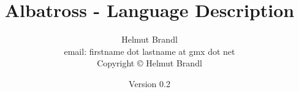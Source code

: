 \documentclass[10pt]{report}
\begin{document}
\title{Albatross - Language Description} \date{Version 0.2}
\author{Helmut Brandl \\
  {\scriptsize email: firstname dot lastname at gmx dot net} \\
  {\scriptsize Copyright {\copyright} Helmut Brandl}} 
\maketitle

\tableofcontents








\end{document}
